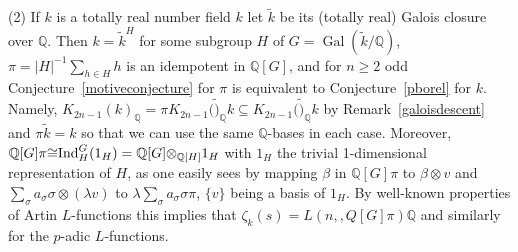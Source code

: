 \documentclass{amsart}
\begin{document}
\begin{remark}
(2)
If $ k $ is a totally real number field $ k $ let $ \tilde k $ be its (totally real) Galois closure over $ {\mathbb Q} $.
Then $ k = \tilde k ^H $ for some subgroup $ H $ of $ G = {\operatorname{Gal}}(\tilde k/{\mathbb Q}) $, $ \pi = |H|^{-1} \sum_{h \in H} h $
is an idempotent in $ {\mathbb Q}[G] $, and for $ n \ge 2 $ odd Conjecture~\ref{motiveconjecture} for $ \pi $ is equivalent to Conjecture~\ref{pborel}
for $ k $.  Namely,  $ {K_{2n-1}(k)_{\mathbb Q}}= \pi {K_{2n-1}(\tilde)_{\mathbb Q}}k \subseteq {K_{2n-1}(\tilde)_{\mathbb Q}}k $ by Remark~\ref{galoisdescent} and $ \pi \tilde k = k $
so that we can use the same $ {\mathbb Q} $-bases in each case.  Moreover, $ {\mathbb Q}[G] \pi {\cong} {\textup{Ind}_{H}^{G}}(1_H) = {\mathbb Q}[G] {\otimes}_{{\mathbb Q}[H]} 1_H $
with $ 1_H $ the trivial 1-dimensional representation of $ H $, as one easily sees by mapping $ {\beta} $
in $ {\mathbb Q}[G] \pi $ to $ {\beta} {\otimes} v $ and $ \sum_{\sigma} a_{\sigma} {\sigma} {\otimes}(\lambda v) $ to $ \lambda \sum_{\sigma} a_{\sigma} {\sigma} \pi $, $ \{v\} $ being a basis of $ 1_H $.
By well-known properties of Artin {$L$-functions{\futurelet{}}} \cite[Prop.~10.4(iv)]{Neu99}
this implies that $ {\zeta}_k(s) = {L(n,{{\mathbb,Q}[G]\pi})}{\mathbb Q} $ and similarly for the
{$p$-adic{\futurelet{}}} {$L$-functions{\futurelet{}}}.
\end{remark}
\end{document}
